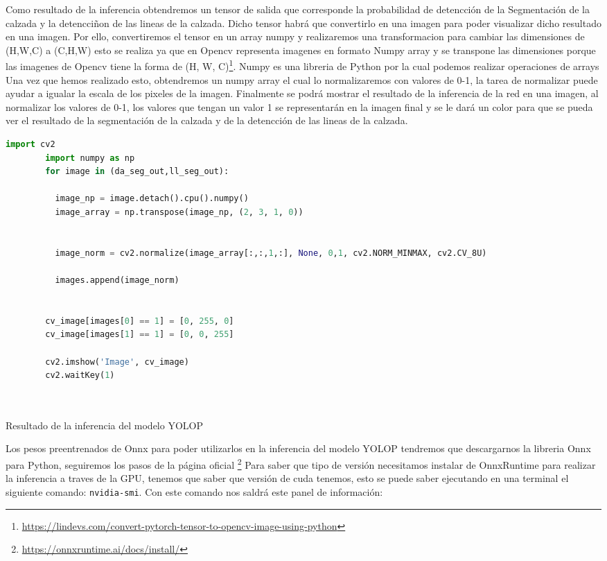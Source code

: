     Como resultado de la inferencia obtendremos un tensor de salida que corresponde la probabilidad de detencción de la Segmentación
    de la calzada y la detencciñon de las lineas de la calzada. Dicho tensor habrá que convertirlo en una imagen para poder visualizar
    dicho resultado en una imagen. 
    Por ello, convertiremos el tensor en un array numpy y realizaremos una transformacion para cambiar las dimensiones de (H,W,C) 
    a (C,H,W) esto se realiza ya que en Opencv representa imagenes en formato Numpy array y se transpone las dimensiones porque las
    imagenes de Opencv tiene la forma de (H, W, C)\footnote{\url{https://lindevs.com/convert-pytorch-tensor-to-opencv-image-using-python}}. Numpy es una libreria de Python por la cual podemos realizar operaciones de arrays
    \newline
    Una vez que hemos realizado esto, obtendremos un numpy array el cual lo normalizaremos con valores de 0-1, la tarea de normalizar 
    puede ayudar a igualar la escala de los pixeles de la imagen. Finalmente se podrá mostrar el resultado de la inferencia de la red 
    en una imagen, al normalizar los valores de 0-1, los valores que tengan un valor 1 se representarán en la imagen final y se le dará un color
    para que se pueda ver el resultado de la segmentación de la calzada y de la detencción de las lineas de la calzada.
    \newpage
    \begin{code}[h]
      \begin{lstlisting}[language=Python]
        import cv2
        import numpy as np
        for image in (da_seg_out,ll_seg_out):

          image_np = image.detach().cpu().numpy()
          image_array = np.transpose(image_np, (2, 3, 1, 0))

        
          image_norm = cv2.normalize(image_array[:,:,1,:], None, 0,1, cv2.NORM_MINMAX, cv2.CV_8U)

          images.append(image_norm)

    
        cv_image[images[0] == 1] = [0, 255, 0]
        cv_image[images[1] == 1] = [0, 0, 255]

        cv2.imshow('Image', cv_image)
        cv2.waitKey(1)

    
      \end{lstlisting}
      \caption[Resultado de la inferencia del modelo YOLOP]{Resultado de la inferencia del modelo YOLOP}
      \label{cod:codejemplo}
      \end{code}  

      Los pesos preentrenados de Onnx para poder utilizarlos en la inferencia del modelo YOLOP tendremos que descargarnos la libreria Onnx para Python, 
      seguiremos los pasos de la página oficial \footnote{\url{https://onnxruntime.ai/docs/install/}}
      Para saber que tipo de versión necesitamos instalar de OnnxRuntime para realizar la inferencia a traves de la GPU, tenemos que saber que versión de cuda
      tenemos, esto se puede saber ejecutando en una terminal el siguiente comando:  \texttt{nvidia-smi}. Con este comando nos saldrá este panel de información:

